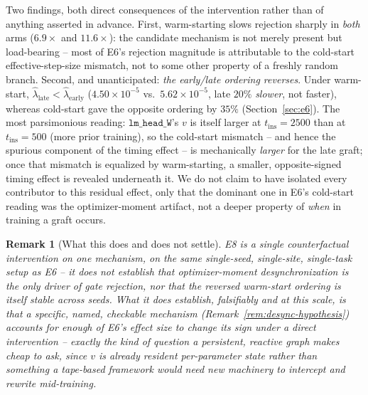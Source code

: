 \documentclass[11pt,a4paper]{article}
\newtheorem{remark}{Remark}
\begin{document}
Two findings, both direct consequences of the intervention rather than of anything asserted in
advance. First, warm-starting slows rejection sharply in \emph{both} arms ($6.9\times$ and
$11.6\times$): the candidate mechanism is not merely present but load-bearing -- most of E6's
rejection magnitude is attributable to the cold-start effective-step-size mismatch, not to some
other property of a freshly random branch. Second, and unanticipated: \emph{the early/late ordering
reverses}. Under warm-start, $\hat\lambda_{\mathrm{late}} < \hat\lambda_{\mathrm{early}}$
($4.50\times10^{-5}$ vs.\ $5.62\times10^{-5}$, late $20\%$ \emph{slower}, not faster), whereas
cold-start gave the opposite ordering by $35\%$ (Section~\ref{sec:e6}). The most parsimonious
reading: $\mathtt{lm\_head\_W}$'s $v$ is itself larger at $t_{\mathrm{ins}}=2500$ than at
$t_{\mathrm{ins}}=500$ (more prior training), so the cold-start mismatch -- and hence the spurious
component of the timing effect -- is mechanically \emph{larger} for the late graft; once that
mismatch is equalized by warm-starting, a smaller, opposite-signed timing effect is revealed
underneath it. We do not claim to have isolated every contributor to this residual effect, only
that the dominant one in E6's cold-start reading was the optimizer-moment artifact, not a deeper
property of \emph{when} in training a graft occurs.

\begin{remark}[What this does and does not settle]
E8 is a single counterfactual intervention on one mechanism, on the same single-seed, single-site,
single-task setup as E6 -- it does not establish that optimizer-moment desynchronization is the
\emph{only} driver of gate rejection, nor that the reversed warm-start ordering is itself stable
across seeds. What it does establish, falsifiably and at this scale, is that a specific, named,
checkable mechanism (Remark~\ref{rem:desync-hypothesis}) accounts for enough of E6's effect size to
change its sign under a direct intervention -- exactly the kind of question a persistent, reactive
graph makes cheap to ask, since $v$ is already resident per-parameter state rather than something a
tape-based framework would need new machinery to intercept and rewrite mid-training.
\end{remark}
\end{document}
